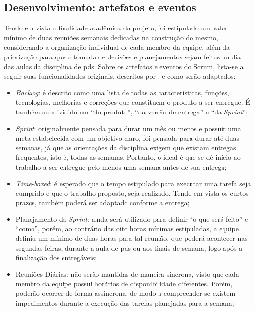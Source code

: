 \subsection{Desenvolvimento: artefatos e eventos}
Tendo em vista a finalidade acadêmica do projeto, foi estipulado um valor mínimo de duas reuniões semanais dedicadas na construção do mesmo, considerando a organização individual de cada membro da equipe, além da priorização para que a tomada de decisões e planejamentos sejam feitas no dia das aulas da disciplina de \acs{pds}. Sobre os artefatos e eventos do Scrum, lista-se a seguir suas funcionalidades originais, descritos por , e como serão adaptados:

\begin{itemize}
\item \textsl{Backlog}: é descrito como uma lista de todas as características, funções, tecnologias, melhorias e correções que constituem o produto a ser entregue. É também subdividido em ``do produto'', ``da versão de entrega'' e ``da \textsl{Sprint}'';

\item \textsl{Sprint}: originalmente pensada para durar um mês ou menos e possuir uma meta estabelecida com um objetivo claro, foi pensada 
para durar até duas semanas, já que as orientações da disciplina exigem que existam entregas frequentes, isto é, todas as semanas. Portanto, o ideal é que se dê início ao trabalho a ser entregue pelo menos uma semana antes de sua entrega;

\item \textsl{Time-boxed}: é esperado que o tempo estipulado para executar uma tarefa seja cumprido e que o trabalho proposto, seja realizado. Tendo em vista os curtos prazos,
também poderá ser adaptado conforme a entrega;

\item Planejamento da \textsl{Sprint}: ainda será utilizado para definir ``o que será feito'' e ``como'', porém, ao contrário das oito horas mínimas 
estipuladas, a equipe definiu um mínimo de duas horas para tal reunião, que poderá acontecer nas segundas-feiras, durante a aula de \acs{pds} ou aos finais de semana, logo após a finalização dos entregáveis;

\item Reuniões Diárias: não serão mantidas de maneira síncrona, visto que cada membro da equipe possui horários de disponibilidade diferentes. Porém, poderão ocorrer de forma assíncrona, de modo a compreender se existem impedimentos durante a execução das tarefas planejadas para a semana;


\end{itemize}
